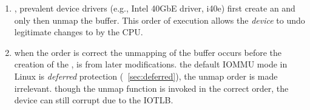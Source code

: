 \begin{enumerate}[label=(\roman*),wide, labelwidth=!, labelindent=0pt]

\item \DIFdelbegin {}\DIFdelend \DIFaddbegin {}\DIFaddend , prevalent device drivers (e.g., Intel 40GbE driver, i40e) first create an \skb{} and only then unmap the buffer. This order of execution allows the \emph{device} to undo legitimate changes to \shinfo{} by the CPU. 

\item \DIFdelbegin {}\DIFdelend \DIFaddbegin {}\DIFaddend when the order is correct \DIFdelbegin {}\DIFdelend \DIFaddbegin {}\DIFaddend the unmapping of the buffer occurs before the creation of the \skb{},  \DIFdelbegin {}\DIFdelend \shinfo{} is \DIFdelbegin {}\DIFdelend \DIFaddbegin {}\DIFaddend from later modifications. \DIFdelbegin {}\DIFdelend \DIFaddbegin {}\DIFaddend the default IOMMU mode in Linux is \emph{deferred} protection (\DIFdelbegin {}\DIFdelend \DIFaddbegin {}\DIFaddend ~\ref{sec:deferred}), the unmap order is made irrelevant. \DIFdelbegin {}\DIFdelend \DIFaddbegin {}\DIFaddend though the unmap function is invoked in the correct order, the device can still corrupt \shinfo{} due to the IOTLB.  


\end{enumerate}
